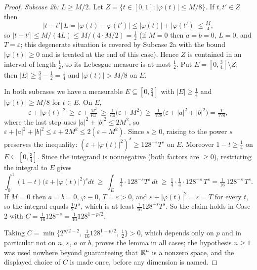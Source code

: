 \begin{proof}
\emph{Subcase 2b: $L\ge M/2$.}  Let
$Z=\{t\in[0,1]:|\varphi(t)|\le M/8\}$.  If $t,t'\in Z$ then
\[
|t-t'|\,L=|\varphi(t)-\varphi(t')|\le|\varphi(t)|+|\varphi(t')|\le\tfrac M4 ,
\]
so $|t-t'|\le M/(4L)\le M/(4\cdot M/2)=\tfrac12$ (if $M=0$ then $a=b=0$,
$L=0$, and $T=\varepsilon$; this degenerate situation is covered by Subcase 2a
with the bound $|\varphi(t)|\ge0$ and is treated at the end of this case).
Hence $Z$ is contained in an interval of length $\tfrac12$, so its Lebesgue
measure is at most $\tfrac12$.  Put $E=[0,\tfrac34]\setminus Z$; then
$|E|\ge\tfrac34-\tfrac12=\tfrac14$ and $|\varphi(t)|>M/8$ on $E$.

In both subcases we have a measurable $E\subseteq[0,\tfrac34]$ with
$|E|\ge\tfrac14$ and $|\varphi(t)|\ge M/8$ for $t\in E$.  On $E$,
\[
\varepsilon+|\varphi(t)|^2\ \ge\ \varepsilon+\tfrac{M^2}{64}
\ \ge\ \tfrac1{64}\bigl(\varepsilon+M^2\bigr)
\ \ge\ \tfrac1{128}\bigl(\varepsilon+|a|^2+|b|^2\bigr)=\tfrac{T}{128},
\]
where the last step uses $|a|^2+|b|^2\le2M^2$, so
$\varepsilon+|a|^2+|b|^2\le\varepsilon+2M^2\le2(\varepsilon+M^2)$.  Since
$s\ge0$, raising to the power $s$ preserves the inequality:
$(\varepsilon+|\varphi(t)|^2)^{s}\ge128^{-s}T^{s}$ on $E$.  Moreover
$1-t\ge\tfrac14$ on $E\subseteq[0,\tfrac34]$.  Since the integrand is
nonnegative (both factors are $\ge0$), restricting the integral to $E$ gives
\[
\int_0^1(1-t)\bigl(\varepsilon+|\varphi(t)|^2\bigr)^{s}dt
\ \ge\ \int_E\tfrac14\cdot128^{-s}T^{s}\,dt
\ \ge\ \tfrac14\cdot\tfrac14\cdot128^{-s}\,T^{s}
=\tfrac1{16}\,128^{-s}\,T^{s} .
\]
If $M=0$ then $a=b=0$, $\varphi\equiv0$, $T=\varepsilon>0$, and
$\varepsilon+|\varphi(t)|^2=\varepsilon=T$ for every $t$, so the integral equals
$\tfrac12T^{s}$, which is at least $\tfrac1{16}128^{-s}T^{s}$.  So the claim
holds in Case 2 with $C=\tfrac1{16}128^{-s}=\tfrac1{16}128^{1-p/2}$.

Taking $C=\min\{2^{p/2-2},\ \tfrac1{16}128^{1-p/2},\ \tfrac12\}>0$, which depends
only on $p$ and in particular not on $n$, $\varepsilon$, $a$ or $b$, proves the
lemma in all cases; the hypothesis $n\ge1$ was used nowhere beyond guaranteeing
that $\mathbb{R}^n$ is a nonzero space, and the displayed choice of $C$ is made once,
before any dimension is named.
\end{proof}
